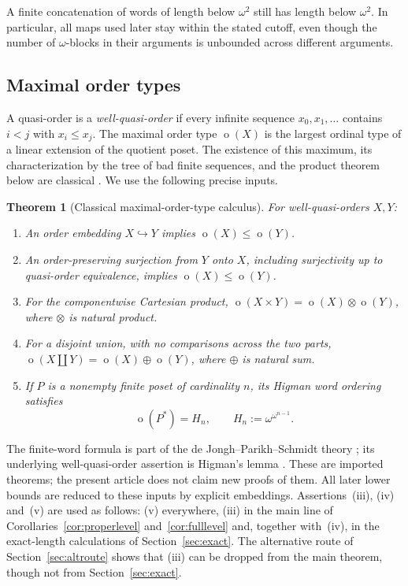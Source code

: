\documentclass[11pt,a4paper]{article}
\numberwithin{equation}{section}
\newtheorem{theorem}{Theorem}[section]
\theoremstyle{definition}
\theoremstyle{remark}
\newcommand{\mot}{\mathop{o}}
\begin{document}
A finite concatenation of words of length below $\omega^2$ still has length
below $\omega^2$. In particular, all maps used later stay within the stated
cutoff, even though the number of $\omega$-blocks in their arguments is
unbounded across different arguments.

\subsection{Maximal order types}
\label{sec:mot}
A quasi-order is a \emph{well-quasi-order} if every infinite sequence
$x_0,x_1,\ldots$ contains $i<j$ with $x_i\le x_j$. The maximal order type
$\mot(X)$ is the largest ordinal type of a linear extension of the quotient
poset. The existence of this maximum, its characterization by the tree of
bad finite sequences, and the product theorem below are classical
\cite{deJonghParikh1977}. We use the following precise inputs.

\begin{theorem}[Classical maximal-order-type calculus]\label{thm:classical}
For well-quasi-orders $X,Y$:
\begin{enumerate}[label=\textnormal{(\roman*)}]
\item An order embedding $X\hookrightarrow Y$ implies $\mot(X)\le\mot(Y)$.
\item An order-preserving surjection from $Y$ onto $X$, including surjectivity
up to quasi-order equivalence, implies $\mot(X)\le\mot(Y)$.
\item For the componentwise Cartesian product,
$\mot(X\times Y)=\mot(X)\otimes\mot(Y)$, where $\otimes$ is natural product.
\item For a disjoint union, with no comparisons across the two parts,
$\mot(X\amalg Y)=\mot(X)\oplus\mot(Y)$, where $\oplus$ is natural sum.
\item If $P$ is a nonempty finite poset of cardinality $n$, its Higman word
ordering satisfies
\begin{equation}\label{eq:finiteword}
 \mot(P^*)=H_n,\qquad H_n:=\omega^{\omega^{n-1}}.
\end{equation}
\end{enumerate}
\end{theorem}

The finite-word formula is part of the de Jongh--Parikh--Schmidt theory
\cite{deJonghParikh1977,Schmidt2020}; its underlying well-quasi-order
assertion is Higman's lemma \cite{Higman1952}. These are imported theorems;
the present article does not claim new proofs of them. All later lower bounds
are reduced to these inputs by explicit embeddings. Assertions~(iii),
(iv) and~(v) are used as follows: (v) everywhere, (iii) in the main line of
Corollaries~\ref{cor:properlevel} and~\ref{cor:fulllevel} and, together
with~(iv), in the exact-length calculations of Section~\ref{sec:exact}. The
alternative route of Section~\ref{sec:altroute} shows that (iii) can be
dropped from the main theorem, though not from Section~\ref{sec:exact}.
\end{document}
